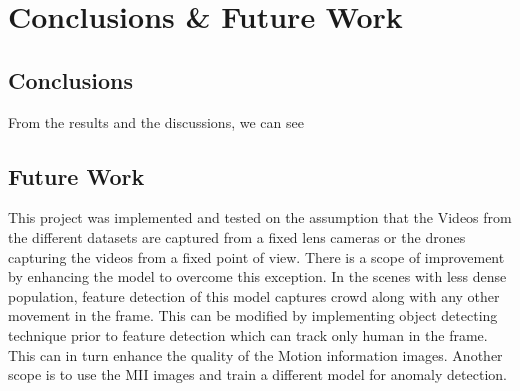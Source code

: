 \chapter{Conclusions \& Future Work}

\section{Conclusions}
From the results and the discussions, we can see

\section{Future Work}
This project was implemented and tested on the assumption that the Videos from the different datasets are captured from a fixed lens cameras or the drones capturing the videos from a fixed point of view. There is a scope of improvement by enhancing the model to overcome this exception. In the scenes with less dense population, feature detection of this model captures crowd along with any other movement in the frame. This can be modified by implementing object detecting technique prior to feature detection which can track only human in the frame. This can in turn enhance the quality of the Motion information images. Another scope is to use the MII images and train a different model for anomaly detection. 
